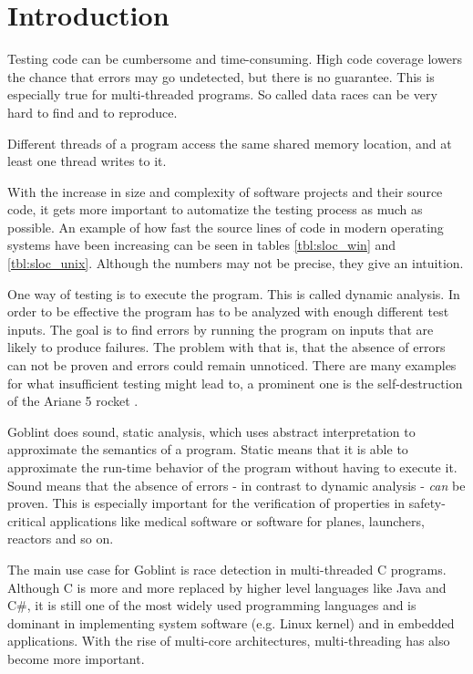 \chapter{Introduction}
\label{chap:introduction}
Testing code can be cumbersome and time-consuming. High code coverage lowers the chance that errors may go undetected, but there is no guarantee. This is especially true for multi-threaded programs. So called data races can be very hard to find and to reproduce.

\begin{definition}
 Different threads of a program access the same shared memory location, and at least one thread writes to it.
\end{definition}

With the increase in size and complexity of software projects and their source code, it gets more important to automatize the testing process as much as possible. An example of how fast the source lines of code in modern operating systems have been increasing can be seen in tables \ref{tbl:sloc_win} and \ref{tbl:sloc_unix}. Although the numbers may not be precise, they give an intuition.



One way of testing is to execute the program. This is called dynamic analysis. In order to be effective the program has to be analyzed with enough different test inputs. The goal is to find errors by running the program on inputs that are likely to produce failures. The problem with that is, that the absence of errors can not be proven and errors could remain unnoticed. There are many examples for what insufficient testing might lead to, a prominent one is the self-destruction of the Ariane 5 rocket \cite{Dowson:1997:ASF:251880.251992}.

Goblint does sound, static analysis, which uses abstract interpretation to approximate the semantics of a program. Static means that it is able to approximate the run-time behavior of the program without having to execute it. Sound means that the absence of errors - in contrast to dynamic analysis - \textit{can} be proven. This is especially important for the verification of properties in safety-critical applications like medical software or software for planes, launchers, reactors and so on.

The main use case for Goblint is race detection in multi-threaded C programs. Although C is more and more replaced by higher level languages like Java and C\#, it is still one of the most widely used programming languages and is dominant in implementing system software (e.g. Linux kernel) and in embedded applications. With the rise of multi-core architectures, multi-threading has also become more important.

